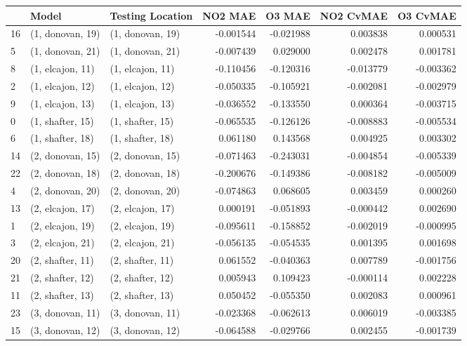\begin{tabular}{lllrrrr}
\toprule
{} &             Model &  Testing Location &   NO2 MAE &    O3 MAE &  NO2 CvMAE &  O3 CvMAE \\
\midrule
16 &  (1, donovan, 19) &  (1, donovan, 19) & -0.001544 & -0.021988 &   0.003838 &  0.000531 \\
5  &  (1, donovan, 21) &  (1, donovan, 21) & -0.007439 &  0.029000 &   0.002478 &  0.001781 \\
8  &  (1, elcajon, 11) &  (1, elcajon, 11) & -0.110456 & -0.120316 &  -0.013779 & -0.003362 \\
2  &  (1, elcajon, 12) &  (1, elcajon, 12) & -0.050335 & -0.105921 &  -0.002081 & -0.002979 \\
9  &  (1, elcajon, 13) &  (1, elcajon, 13) & -0.036552 & -0.133550 &   0.000364 & -0.003715 \\
0  &  (1, shafter, 15) &  (1, shafter, 15) & -0.065535 & -0.126126 &  -0.008883 & -0.005534 \\
6  &  (1, shafter, 18) &  (1, shafter, 18) &  0.061180 &  0.143568 &   0.004925 &  0.003302 \\
14 &  (2, donovan, 15) &  (2, donovan, 15) & -0.071463 & -0.243031 &  -0.004854 & -0.005339 \\
22 &  (2, donovan, 18) &  (2, donovan, 18) & -0.200676 & -0.149386 &  -0.008182 & -0.005009 \\
4  &  (2, donovan, 20) &  (2, donovan, 20) & -0.074863 &  0.068605 &   0.003459 &  0.000260 \\
13 &  (2, elcajon, 17) &  (2, elcajon, 17) &  0.000191 & -0.051893 &  -0.000442 &  0.002690 \\
1  &  (2, elcajon, 19) &  (2, elcajon, 19) & -0.095611 & -0.158852 &  -0.002019 & -0.000995 \\
3  &  (2, elcajon, 21) &  (2, elcajon, 21) & -0.056135 & -0.054535 &   0.001395 &  0.001698 \\
20 &  (2, shafter, 11) &  (2, shafter, 11) &  0.061552 & -0.040363 &   0.007789 & -0.001756 \\
21 &  (2, shafter, 12) &  (2, shafter, 12) &  0.005943 &  0.109423 &  -0.000114 &  0.002228 \\
11 &  (2, shafter, 13) &  (2, shafter, 13) &  0.050452 & -0.055350 &   0.002083 &  0.000961 \\
23 &  (3, donovan, 11) &  (3, donovan, 11) & -0.023368 & -0.062613 &   0.006019 & -0.003385 \\
15 &  (3, donovan, 12) &  (3, donovan, 12) & -0.064588 & -0.029766 &   0.002455 & -0.001739 \\

\end{tabular}
